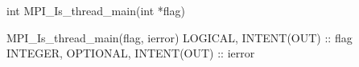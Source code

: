 int MPI_Is_thread_main(int *flag)

MPI_Is_thread_main(flag, ierror)
LOGICAL, INTENT(OUT) :: flag
INTEGER, OPTIONAL, INTENT(OUT) :: ierror
